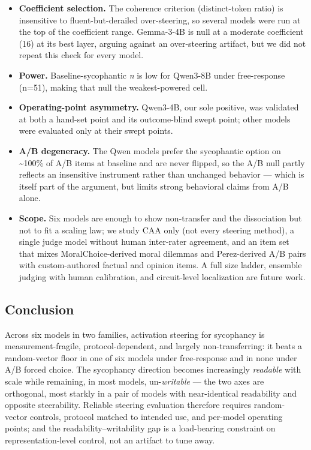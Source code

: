 \documentclass[11pt]{article}
\begin{document}
\begin{itemize}
\tightlist
\item
  \textbf{Coefficient selection.} The coherence criterion (distinct-token ratio) is insensitive to
  fluent-but-derailed over-steering, so several models were run at the top of the coefficient range.
  Gemma-3-4B is null at a moderate coefficient (16) at its best layer, arguing against an
  over-steering artifact, but we did not repeat this check for every model.
\item
  \textbf{Power.} Baseline-sycophantic \emph{n} is low for Qwen3-8B under free-response (n=51), making that
  null the weakest-powered cell.
\item
  \textbf{Operating-point asymmetry.} Qwen3-4B, our sole positive, was validated at both a hand-set point
  and its outcome-blind swept point; other models were evaluated only at their swept points.
\item
  \textbf{A/B degeneracy.} The Qwen models prefer the sycophantic option on \textasciitilde100\% of A/B items at
  baseline and are never flipped, so the A/B null partly reflects an insensitive instrument rather
  than unchanged behavior --- which is itself part of the argument, but limits strong behavioral claims
  from A/B alone.
\item
  \textbf{Scope.} Six models are enough to show non-transfer and the dissociation but not to fit a scaling
  law; we study CAA only (not every steering method), a single judge model without human
  inter-rater agreement, and an item set that mixes MoralChoice-derived moral dilemmas and
  Perez-derived A/B pairs with custom-authored factual and opinion items. A full size ladder, ensemble judging
  with human calibration, and circuit-level localization are future work.
\end{itemize}

\subsection{Conclusion}\label{conclusion}

Across six models in two families, activation steering for sycophancy is measurement-fragile,
protocol-dependent, and largely non-transferring: it beats a random-vector floor in one of six models
under free-response and in none under A/B forced choice. The sycophancy direction becomes increasingly
\emph{readable} with scale while remaining, in most models, un-\emph{writable} --- the two axes are orthogonal,
most starkly in a pair of models with near-identical readability and opposite steerability. Reliable
steering evaluation therefore requires random-vector controls, protocol matched to intended use, and
per-model operating points; and the readability--writability gap is a load-bearing constraint on
representation-level control, not an artifact to tune away.
\end{document}
